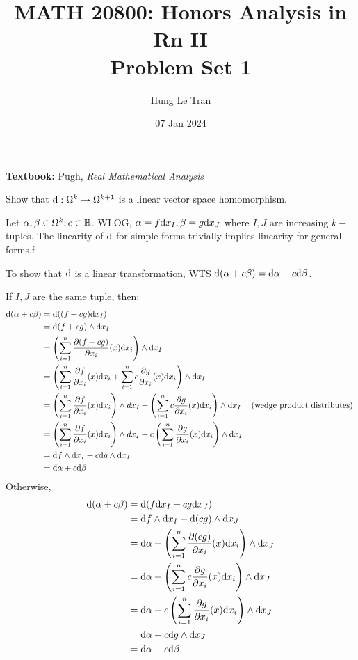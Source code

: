 \documentclass[a4paper, 12pt]{article}
\title{MATH 20800: Honors Analysis in Rn II \\ \large Problem Set 1}
\date{07 Jan 2024}
\author{Hung Le Tran}
\begin{document}
\maketitle
\setcounter{section}{1}
\textbf{Textbook:} Pugh, \textit{Real Mathematical Analysis}
\begin{problem} 
    Show that $\mathrm{d}: \Omega^k \to \Omega^{k+1}$ is a linear vector space homomorphism.
\end{problem}
\begin{solution}
    Let $\alpha, \beta \in \Omega^k; c \in \mathbb{R}$. WLOG, $\alpha = f \mathrm{d} x_{I}, \beta = g \mathrm{d} x_{J}$ where $I, J$ are increasing $k-$tuples. The linearity of $\mathrm{d}$ for simple forms trivially implies linearity for general forms.f

    To show that $\mathrm{d}$ is a linear transformation, WTS $\mathrm{d} (\alpha + c \beta) = \mathrm{d} \alpha + c \mathrm{d} \beta$.

    If $I, J$ are the same tuple, then: \begin{align*} 
        \mathrm{d}(\alpha + c \beta) &= \mathrm{d} ((f + cg) \mathrm{d} x_I) \\
        &= \mathrm{d} (f + cg) \wedge \mathrm{d} x_I \\
        &= \left(\sum_{i=1}^{n} \frac{\partial (f + cg)}{\partial x_i}(x) \mathrm{d} x_i\right) \wedge \mathrm{d} x_I \\
        &= \left(\sum_{i=1}^{n} \frac{\partial f}{\partial x_i}(x) \mathrm{d} x_i + \sum_{i=1}^{n} c \frac{\partial g}{\partial x_i}(x) \mathrm{d} x_i\right) \wedge \mathrm{d} x_I \\
        &= \left(\sum_{i=1}^{n} \frac{\partial f}{\partial x_i}(x) \mathrm{d} x_i \right) \wedge dx_I + \left(\sum_{i=1}^{n} c \frac{\partial g}{\partial x_i}(x) \mathrm{d} x_i\right) \wedge \mathrm{d} x_I \quad \:\text{(wedge product distributes)}\: \\
        &= \left(\sum_{i=1}^{n} \frac{\partial f}{\partial x_i}(x) \mathrm{d} x_i \right) \wedge dx_I + c\left(\sum_{i=1}^{n}\frac{\partial g}{\partial x_i}(x) \mathrm{d} x_i\right) \wedge \mathrm{d} x_I \\
        &= \mathrm{d} f \wedge \mathrm{d} x_I + c \mathrm{d} g \wedge \mathrm{d} x_I \\
        &= \mathrm{d} \alpha + c \mathrm{d} \beta
    \end{align*}
    Otherwise,
    \begin{align*}
        \mathrm{d} (\alpha + c \beta ) &= \mathrm{d} (f \mathrm{d} x_I + cg \mathrm{d} x_J) \\
        &= \mathrm{d} f \wedge \mathrm{d} x_I + \mathrm{d} (cg) \wedge \mathrm{d} x_J \\
        &= \mathrm{d} \alpha + \left( \sum_{i=1}^{n} \frac{\partial (cg)}{\partial x_i} (x) \mathrm{d} x_i \right) \wedge \mathrm{d} x_J \\
        &= \mathrm{d} \alpha + \left(\sum_{i=1}^{n} c \frac{\partial g}{\partial x_i}(x) \mathrm{d} x_i \right) \wedge \mathrm{d} x_J \\
        &= \mathrm{d} \alpha + c \left(\sum_{i=1}^{n} \frac{\partial g}{\partial x_i}(x) \mathrm{d} x_i \right) \wedge \mathrm{d} x_J \\
        &= \mathrm{d} \alpha + c \mathrm{d} g \wedge \mathrm{d} x_J \\
        &= \mathrm{d} \alpha + c \mathrm{d} \beta
    \end{align*}
\end{solution}
\end{document}
